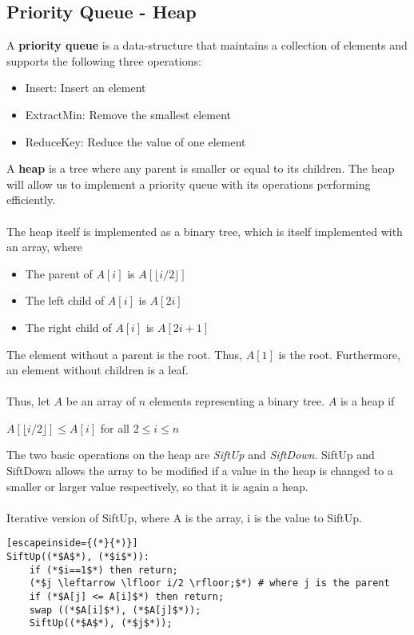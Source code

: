 \documentclass[a4paper]{article}
\begin{document}
\subsection{Priority Queue - Heap}
A \textbf{priority queue} is a data-structure that maintains a collection of elements and supports the following three operations:
\begin{itemize}
	\item Insert: Insert an element
	\item ExtractMin: Remove the smallest element
	\item ReduceKey: Reduce the value of one element
\end{itemize}
A \textbf{heap} is a tree where any parent is smaller or equal to its children. The heap will allow us to implement a priority queue with its operations performing efficiently.\\ \\
The heap itself is implemented as a binary tree, which is itself implemented with an array, where
\begin{itemize}
	\item The parent of $A[i]$ is $A[\lfloor i/2 \rfloor]$
	\item The left child of $A[i]$ is $A[2i]$
	\item The right child of $A[i]$  is $A[2i + 1]$
\end{itemize}
The element without a parent is the root. Thus, $A[1]$ is the root. Furthermore, an element without children is a leaf.\\ \\
Thus, let $A$ be an array of $n$ elements representing a binary tree. $A$ is a heap if
\begin{center}
	$A[\lfloor i/2 \rfloor] \le A[i]$ for all $2 \le i \le n$
\end{center}
The two basic operations on the heap are \textit{SiftUp} and \textit{SiftDown}. SiftUp and SiftDown allows the array to be modified if a value in the heap is changed to a smaller or larger value respectively, so that it is again a heap.\\ \\
Iterative version of SiftUp, where A is the array, i is the value to SiftUp.
\begin{lstlisting}[escapeinside={(*}{*)}]
SiftUp((*$A$*), (*$i$*)):
	if (*$i==1$*) then return;
	(*$j \leftarrow \lfloor i/2 \rfloor;$*) # where j is the parent
	if (*$A[j] <= A[i]$*) then return;
	swap ((*$A[i]$*), (*$A[j]$*));
	SiftUp((*$A$*), (*$j$*));
\end{lstlisting}
\end{document}
